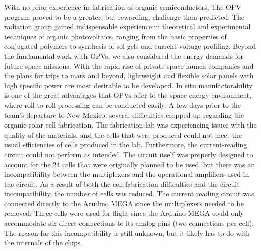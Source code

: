 	With no prior experience in fabrication of organic semiconductors, The OPV program proved to be a greater, but rewarding, challenge than predicted. The radiation group gained indispensable experience in theoretical and experimental techniques of organic photovoltaics, ranging from the basic properties of conjugated polymers to synthesis of sol-gels and current-voltage profiling. Beyond the fundamental work with OPVs, we also considered the energy demands for future space missions. With the rapid rise of private space launch companies and the plans for trips to mars and beyond, lightweight and flexible solar panels with high specific power are most desirable to be developed. In situ manufactorability is one of the great advantages that OPVs offer to the space energy environment, where roll-to-roll processing can be conducted easily. 
A few days prior to the team's departure to New Mexico, several difficulties cropped up regarding the organic solar cell fabrication.
The fabrication lab was experiencing issues with the quality of the materials, and the cells that were produced could not meet the usual efficiencies of cells produced in the lab.
Furthermore, the current-reading circuit could not perform as intended.
The circuit itself was properly designed to account for the 24 cells that were originally planned to be used, but there was an incompatibility between the multiplexers and the operational amplifiers used in the circuit.
As a result of both the cell fabrication difficulties and the circuit incompatibility, the number of cells was reduced.
The current reading circuit was connected directly to the Arudino MEGA since the multiplexers needed to be removed.
Three cells were used for flight since the Arduino MEGA could only accommodate six direct connections to its analog pins (two connections per cell).
The reason for this incompatibility is still unknown, but it likely has to do with the internals of the chips.

